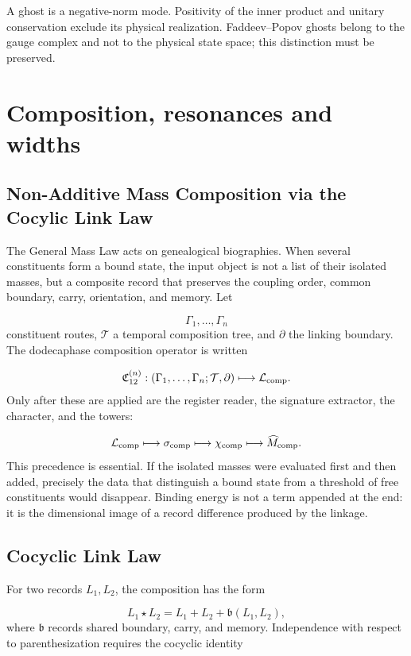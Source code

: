 A ghost is a negative-norm mode. Positivity of the inner product and unitary conservation exclude its physical realization. Faddeev--Popov ghosts belong to the gauge complex and not to the physical state space; this distinction must be preserved.

\section{Composition, resonances and widths}
\subsection{Non-Additive Mass Composition via the Cocylic Link Law}
The General Mass Law acts on genealogical biographies. When several constituents form a bound state, the input object is not a list of their isolated masses, but a composite record that preserves the coupling order, common boundary, carry, orientation, and memory. Let

\[
\Gamma_1,\ldots,\Gamma_n
\]
constituent routes, \(\mathcal T\) a temporal composition tree, and \(\partial\) the linking boundary. The dodecaphase composition operator is written

\[
\mathfrak C_{12}^{(n)}:
(\Gamma_1,\ldots,\Gamma_n;\mathcal T,\partial)
\longmapsto \mathcal L_{\rm comp}.
\]
Only after these are applied are the register reader, the signature extractor, the character, and the towers:

\[
\mathcal L_{\rm comp}
\longmapsto \sigma_{\rm comp}
\longmapsto \chi_{\rm comp}
\longmapsto \widehat M_{\rm comp}.
\]
This precedence is essential. If the isolated masses were evaluated first and then added, precisely the data that distinguish a bound state from a threshold of free constituents would disappear. Binding energy is not a term appended at the end: it is the dimensional image of a record difference produced by the linkage.

\subsection{Cocyclic Link Law}
For two records \(L_1,L_2\), the composition has the form

\[
L_1\star L_2
=L_1+L_2+\mathfrak b(L_1,L_2),
\]
where \(\mathfrak b\) records shared boundary, carry, and memory. Independence with respect to parenthesization requires the cocyclic identity

